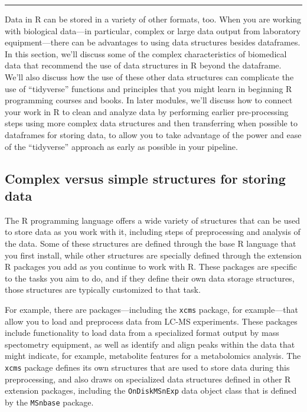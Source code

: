 \documentclass[]{tufte-book}
\begin{document}
\begin{center}\rule{0.5\linewidth}{0.5pt}\end{center}

Data in R can be stored in a variety of other formats, too. When you are working
with biological data---in particular, complex or large data output from laboratory
equipment---there can be advantages to using data structures besides dataframes.
In this section, we'll discuss some of the complex characteristics of biomedical
data that recommend the use of data structures in R beyond the dataframe. We'll
also discuss how the use of these other data structures can complicate the use of
``tidyverse'' functions and principles that you might learn in beginning R programming
courses and books. In later modules, we'll discuss how to connect your work in R
to clean and analyze data by performing earlier pre-processing steps using more
complex data structures and then transferring when possible to dataframes for
storing data, to allow you to take advantage of the power and ease of the
``tidyverse'' approach as early as possible in your pipeline.

\hypertarget{complex-versus-simple-structures-for-storing-data}{%
\subsection{Complex versus simple structures for storing data}\label{complex-versus-simple-structures-for-storing-data}}

The R programming language offers a wide variety of structures that can be
used to store data as you work with it, including steps of preprocessing
and analysis of the data. Some of these structures are defined through the
base R language that you first install, while other structures are specially
defined through the extension R packages you add as you continue to work
with R. These packages are specific to the tasks you aim to do, and if they
define their own data storage structures, those structures are typically
customized to that task.

For example, there are packages---including the \texttt{xcms} package, for
example---that allow you to load and preprocess data from LC-MS experiments.
These packages include functionality to load data from a specialized format
output by mass spectometry equipment, as well as identify and align peaks within
the data that might indicate, for example, metabolite features for a
metabolomics analysis. The \texttt{xcms} package defines its own structures that are
used to store data during this preprocessing, and also draws on specialized data
structures defined in other R extension packages, including the \texttt{OnDiskMSnExp}
data object class that is defined by the \texttt{MSnbase} package.
\end{document}
